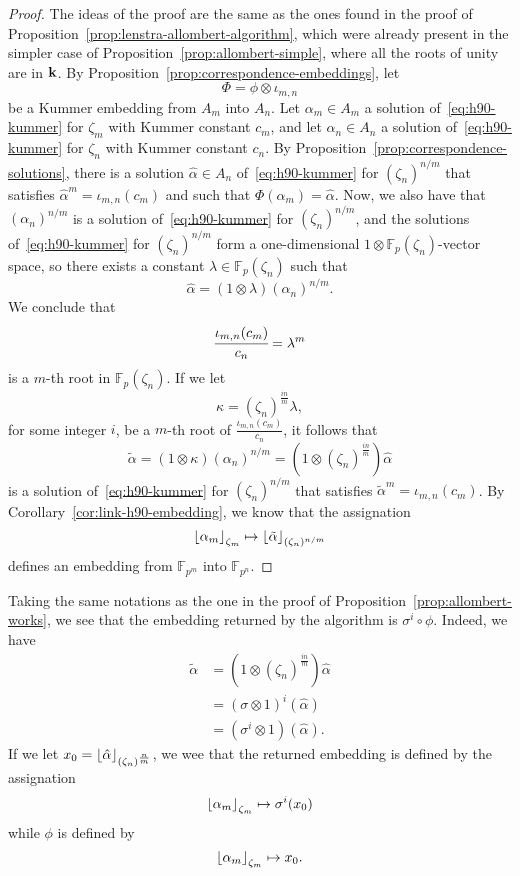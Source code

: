 \begin{proof}
  The ideas of the proof are the same as the ones found in the proof of
  Proposition~\ref{prop:lenstra-allombert-algorithm}, which were already present
  in the simpler case of Proposition~\ref{prop:allombert-simple}, where all the
  roots of unity are in $\mathbf{k}$. By
  Proposition~\ref{prop:correspondence-embeddings}, let 
  \[
    \Phi=\phi\otimes\iota_{m, n}
  \]
  be a Kummer embedding from $A_m$ into $A_n$. Let $\alpha_m\in A_m$ a solution
  of~\eqref{eq:h90-kummer} for $\zeta_m$ with Kummer constant $c_m$, and let
  $\alpha_n\in A_n$ a solution of~\eqref{eq:h90-kummer} for $\zeta_n$ with
  Kummer constant $c_n$. By
  Proposition~\ref{prop:correspondence-solutions}, there is a solution $\hat\alpha\in
  A_n$ of~\eqref{eq:h90-kummer} for $(\zeta_n)^{n/m}$ that satisfies
  $\hat{\alpha}^m=\iota_{m, n}(c_m)$ and such that $\Phi(\alpha_m)=\hat\alpha$.
  Now, we also have that $(\alpha_n)^{n/m}$ is a solution
  of~\eqref{eq:h90-kummer} for $(\zeta_n)^{n/m}$, and the solutions
  of~\eqref{eq:h90-kummer} for $(\zeta_n)^{n/m}$ form a one-dimensional
  $1\otimes\mathbb{F}_{p}(\zeta_n)$-vector space, so there exists a constant
  $\lambda\in\mathbb{F}_{p}(\zeta_n)$ such that
  \[
    \hat\alpha = (1\otimes\lambda)(\alpha_n)^{n/m}.
  \]
  We conclude that 
  \[
    \cfrac{\iota_{m, n}(c_m)}{c_n} = \lambda^m
  \]
  is a $m$-th root in $\mathbb{F}_{p}(\zeta_n)$. If we let
  \[
    \kappa = (\zeta_n)^{\frac{in}{m}}\lambda,
  \]
  for some integer $i$, be a $m$-th root of $\frac{\iota_{m, n}(c_m)}{c_n}$, it
  follows that
  \[
    \tilde\alpha = (1\otimes\kappa)(\alpha_n)^{n/m} =
    (1\otimes(\zeta_n)^{\frac{in}{m}})\hat\alpha
  \]
  is a solution of~\eqref{eq:h90-kummer} for $(\zeta_n)^{n/m}$ that satisfies
  $\tilde\alpha^m = \iota_{m,n}(c_m)$. By
  Corollary~\ref{cor:link-h90-embedding}, we know that the assignation
  \[
    \left\lfloor \alpha_m \right\rfloor_{\zeta_m}\mapsto\left\lfloor \tilde\alpha \right\rfloor_{(\zeta_n)^{n/m}}
  \]
  defines an embedding from $\mathbb{F}_{p^m}$ into $\mathbb{F}_{p^{n}}$.
\end{proof}
\begin{rem}
  Taking the same notations as the one in the proof of
  Proposition~\ref{prop:allombert-works}, we see that the embedding returned by
  the algorithm is $\sigma^i\circ\phi$. Indeed, we have
  \begin{align*}
    \tilde\alpha &= (1\otimes(\zeta_n)^{\frac{in}{m}})\hat\alpha\\
    &= (\sigma\otimes1)^i(\hat\alpha)\\
    &= (\sigma^i\otimes1)(\hat\alpha).
  \end{align*}
  If we let $x_0=\left\lfloor \hat\alpha \right\rfloor_{(\zeta_n)^{\frac{n}{m}}}$, we wee that the
  returned embedding is defined by the assignation
  \[
    \left\lfloor \alpha_m \right\rfloor_{\zeta_m}\mapsto\sigma^i(x_0)
  \]
  while $\phi$ is defined by
  \[
    \left\lfloor \alpha_m \right\rfloor_{\zeta_m}\mapsto x_0.
  \]
\end{rem}
